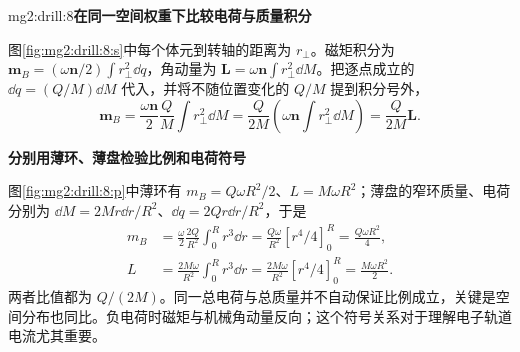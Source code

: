 \begin{drillsolution}{mg2:drill:8}\textbf{在同一空间权重下比较电荷与质量积分}\par\nobreak
图\ref{fig:mg2:drill:8:s}中每个体元到转轴的距离为 $r_\perp$。磁矩积分为 $\bm m_B=(\omega\bm n/2)\int r_\perp^2\dd q$，角动量为 $\bm L=\omega\bm n\int r_\perp^2\dd M$。把逐点成立的 $\dd q=(Q/M)\dd M$ 代入，并将不随位置变化的 $Q/M$ 提到积分号外，
\[
 \bm m_B=\frac{\omega\bm n}{2}\frac QM\int r_\perp^2\dd M
 =\frac{Q}{2M}\left(\omega\bm n\int r_\perp^2\dd M\right)
 =\frac{Q}{2M}\bm L.
\]



\par\medskip{}\noindent\textbf{分别用薄环、薄盘检验比例和电荷符号}\par\nobreak
图\ref{fig:mg2:drill:8:p}中薄环有 $m_B=Q\omega R^2/2$、$L=M\omega R^2$；薄盘的窄环质量、电荷分别为
$\dd M=2Mr\dd r/R^2$、$\dd q=2Qr\dd r/R^2$，于是
\[
 \begin{aligned}
 m_B&=\frac{\omega}{2}\frac{2Q}{R^2}\int_0^Rr^3\dd r
 =\frac{Q\omega}{R^2}[r^4/4]_0^R=\frac{Q\omega R^2}{4},\\
 L&=\frac{2M\omega}{R^2}\int_0^Rr^3\dd r
 =\frac{2M\omega}{R^2}[r^4/4]_0^R=\frac{M\omega R^2}{2}.
 \end{aligned}
\]
两者比值都为 $Q/(2M)$。同一总电荷与总质量并不自动保证比例成立，关键是空间分布也同比。负电荷时磁矩与机械角动量反向；这个符号关系对于理解电子轨道电流尤其重要。\end{drillsolution}
